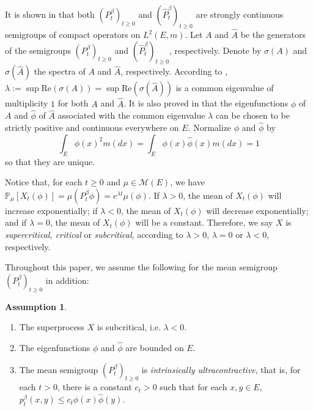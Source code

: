 \documentclass[12pt,a4paper]{amsart}
\numberwithin{equation}{section}
\theoremstyle{plain}
\theoremstyle{definition}
\newtheorem{asp}{Assumption}
\begin{document}
It is shown in \cite{RenSongZhang2015Limit, RenSongZhang2017Central} that both
$(P^\beta_t)_{t \geq 0}$ and $(\widehat P_t^{\beta})_{t\geq 0}$ are strongly
continuous semigroups of compact operators on $L^2(E,m)$. Let $A$ and $\widehat
A$ be the generators of the semigroups $(P^\beta_t)_{t \geq 0}$ and $(\widehat
P^\beta_t)_{t \geq 0}$, respectively. Denote by $\sigma(A)$ and $\sigma(\widehat
A)$ the spectra of $A$ and $\widehat A$, respectively. According to
\cite[Theorem V.6.6]{Schaefer1974Banach}, $\lambda := \sup \text{Re}(\sigma(A))
= \sup \text{Re}(\sigma(\widehat A))$ is a common eigenvalue of multiplicity $1$
for both $A$ and $\widehat A$. It is also proved in
\cite{RenSongZhang2015Limit,RenSongZhang2017Central} that the eigenfunctions
$\phi$ of $A$ and $\widehat\phi$ of $\widehat A$ associated with the common
eigenvalue $\lambda$ can be chosen to be strictly positive and continuous
everywhere on $E$. Normalize $\phi$ and $\widehat\phi$ by
\[	
	\int_E \phi(x)^2 m(dx) = \int_E \phi(x) \widehat \phi(x) m(dx) = 1
\]
so that they are unique.
\par
Notice that, for each $t \geq 0$ and $\mu \in \mathcal M(E)$, we have $ \mathbb
P_\mu[X_t(\phi)] = \mu(P^\beta_t \phi) = e^{\lambda t} \mu(\phi). $ If $\lambda
> 0$, the mean of $X_t(\phi)$ will increase exponentially; if $\lambda < 0$, the
mean of $X_t(\phi)$ will decrease exponentially; and if $\lambda = 0$, the mean
of $X_t(\phi)$ will be a constant. Therefore, we say $X$ is \emph{supercritical,
  critical} or \emph{subcritical}, according to $\lambda > 0$, $\lambda = 0$ or
$\lambda < 0$, respectively.
\par
Throughout this paper, we assume the following for the mean semigroup
$(P_t^\beta)_{t\geq 0}$ in addition:
\begin{asp} ~
\label{asp:IU}
\begin{enumerate}
\item The superprocess $X$ is subcritical, i.e. $\lambda < 0$.
\item The eigenfunctions $\phi$ and $\widehat\phi$ are bounded on $E$.
\item The mean semigroup $(P_t^\beta)_{t\geq 0}$ is \emph{intrinsically ultracontractive}, that is, for each $t>0$, there is a constant $c_t >0$ such that for each $x,y\in E$, $p^\beta_t(x,y) \leq c_t \phi(x) \widehat\phi(y)$.
\end{enumerate}
\end{asp}
\end{document}
